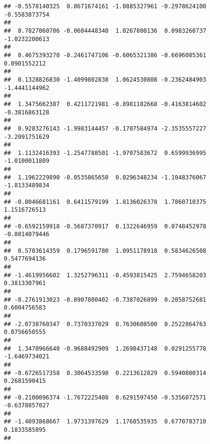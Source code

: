 \documentclass[]{article}
\begin{document}
\begin{verbatim}
## -0.5578140325  0.8671674161 -1.0885327961 -0.2978624100 -0.5583873754 
##                                                                       
##  0.7827060706 -0.0604448340  1.0267800136  0.0983260737 -1.0232200613 
##                                                                       
##  0.4675393270 -0.2461747106 -0.6065321386 -0.6696085361  0.0901552212 
##                                                                       
##  0.1328826830 -1.4099802838  1.0624530808 -0.2362484903 -1.4441144962 
##                                                                       
##  1.3475662387  0.4211721981 -0.8981182668 -0.4163814602 -0.3816863128 
##                                                                       
##  0.9283276143 -1.9983144457 -0.1707584974 -2.3535557227 -3.2091751629 
##                                                                       
##  1.1132416393 -1.2547788501 -1.9707583672  0.6599936995 -1.0100011809 
##                                                                       
##  1.1962229890 -0.0535865650  0.0296348234 -1.1048376067 -1.8133489834 
##                                                                       
## -0.8046681161  0.6411579199  1.8136026378  1.7860710375  1.1516726513 
##                                                                       
## -0.6592159918 -0.5687370917  0.1322646959  0.0748452978 -0.8014079446 
##                                                                       
##  0.5703614359  0.1796591780  1.0951178918  0.5834626508  0.5477694136 
##                                                                       
## -1.4619956602  1.3252796311 -0.4593815425  2.7594658203  0.3813307961 
##                                                                       
## -0.2761913023 -0.8907800402 -0.7387026899  0.2058752681  0.6004756583 
##                                                                       
## -2.0738760347  0.7370337029  0.7630608500  0.2522864763  0.0756650555 
##                                                                       
##  1.3470966640 -0.9688492909  1.2698437148  0.0291255778 -1.6469734021 
##                                                                       
## -0.6726517358  0.3064533598  0.2213612829  0.5940800314  0.2681590415 
##                                                                       
## -0.2100096374 -1.7672225408  0.6291597450 -0.5356072571 -0.6378857027 
##                                                                       
## -1.4093868667  1.9731397629  1.1768535935  0.6770783710  0.1833585895 
##                                                                       

\end{verbatim}
\end{document}
